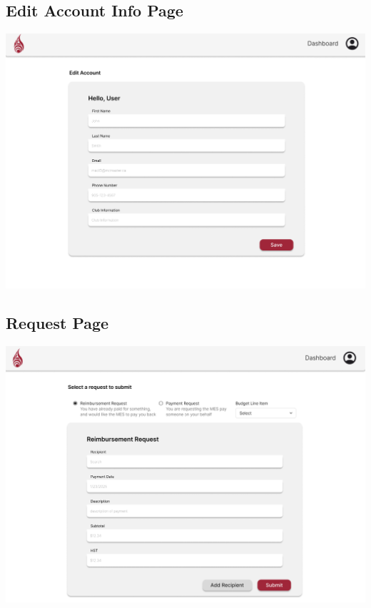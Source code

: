 \documentclass[12pt, titlepage]{article}
\begin{document}
\subsection{Edit Account Info Page}
\includegraphics[]{imgs/EditAccountInfoPage.png}

\subsection{Request Page}
\includegraphics[]{imgs/RequestPage.png}
\end{document}
